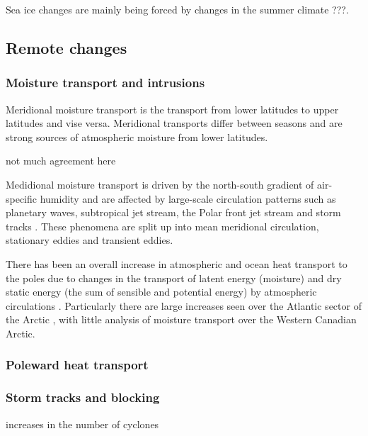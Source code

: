 \documentclass[12pt, oneside]{article}
\begin{document}
Sea ice changes are mainly being forced by changes in the summer climate ???.





\subsection{Remote changes}\label{remote}
\subsubsection{Moisture transport and intrusions}
Meridional moisture transport is the transport from lower latitudes to upper latitudes and vise versa. Meridional transports differ between seasons and are strong sources of atmospheric moisture from lower latitudes. 

not much agreement here 

Medidional moisture transport is driven by the north-south gradient of air-specific humidity and are affected by large-scale circulation patterns such as planetary waves, subtropical jet stream, the Polar front jet stream and storm tracks \cite{gimeno2019atmospheric}. These phenomena are split up into mean meridional circulation, stationary eddies and transient eddies. 

There has been an overall increase in atmospheric and ocean heat transport to the poles due to changes in the transport of latent energy (moisture) and dry static energy (the sum of sensible and potential energy) by atmospheric circulations \cite{mcgraw2020changes}. Particularly there are large increases seen over the Atlantic sector of the Arctic \cite{dufour2016atmospheric}, with little analysis of moisture transport over the Western Canadian Arctic. 

\subsubsection{Poleward heat transport}


\subsubsection{Storm tracks and blocking}
increases in the number of cyclones 

\end{document}
